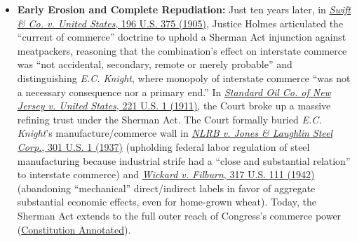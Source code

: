 \documentclass[12pt]{article}
\begin{document}
\begin{itemize}

\item \textbf{Early Erosion and Complete Repudiation:} Just ten years later, in \href{https://supreme.justia.com/cases/federal/us/196/375/}{\textit{Swift \& Co. v. United States}, 196 U.S. 375 (1905)}, Justice Holmes articulated the ``current of commerce'' doctrine to uphold a Sherman Act injunction against meatpackers, reasoning that the combination's effect on interstate commerce was ``not accidental, secondary, remote or merely probable'' and distinguishing \textit{E.C. Knight}, where monopoly of interstate commerce ``was not a necessary consequence nor a primary end.'' In \href{https://supreme.justia.com/cases/federal/us/221/1/}{\textit{Standard Oil Co. of New Jersey v. United States}, 221 U.S. 1 (1911)}, the Court broke up a massive refining trust under the Sherman Act. The Court formally buried \textit{E.C. Knight}'s manufacture/commerce wall in \href{https://supreme.justia.com/cases/federal/us/301/1/}{\textit{NLRB v. Jones \& Laughlin Steel Corp.}, 301 U.S. 1 (1937)} (upholding federal labor regulation of steel manufacturing because industrial strife had a ``close and substantial relation'' to interstate commerce) and \href{https://supreme.justia.com/cases/federal/us/317/111/}{\textit{Wickard v. Filburn}, 317 U.S. 111 (1942)} (abandoning ``mechanical'' direct/indirect labels in favor of aggregate substantial economic effects, even for home-grown wheat). Today, the Sherman Act extends to the full outer reach of Congress's commerce power (\href{https://www.law.cornell.edu/constitution-conan/article-1/section-8/clause-3/sherman-antitrust-act-of-1890-and-sugar-trust-case}{Constitution Annotated}).

\end{itemize}
\end{document}
